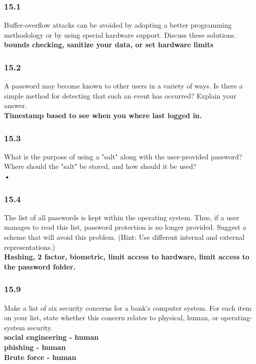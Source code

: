 \documentclass[a4paper,10pt,titlepage]{report}
\begin{document}
\subsubsection{15.1} Buffer-overflow attacks can be avoided by adopting a better programming methodology or by using special hardware support. Discuss these solutions.
\\ \hspace{10mm} \textbf{bounds checking, sanitize your data, or set hardware limits} \\


\subsubsection{15.2} A password may become known to other users in a variety of ways. Is there a simple method for detecting that such an event has occurred? Explain your answer.
\\ \hspace{10mm} \textbf{Timestamp based to see when you where last logged in.} \\


\subsubsection{15.3} What is the purpose of using a "salt" along with the user-provided password? Where should the "salt" be stored, and how should it be used?
\\ \hspace{10mm} \textbf{•} \\


\subsubsection{15.4} The list of all passwords is kept within the operating system. Thus, if a user manages to read this list, password protection is no longer provided. Suggest a scheme that will avoid this problem. (Hint: Use different internal and external representations.)
\\ \hspace{10mm} \textbf{Hashing, 2 factor, biometric, limit access to hardware, limit access to the password folder.} \\



\subsubsection{15.9} Make a list of six security concerns for a bank's computer system. For each item on your list, state whether this concern relates to physical, human, or operating-system security.
\\ \hspace{10mm} \textbf{social engineering - human} 
\\ \hspace{10mm} \textbf{phishing - human} 
\\ \hspace{10mm} \textbf{Brute force - human} 
\end{document}
